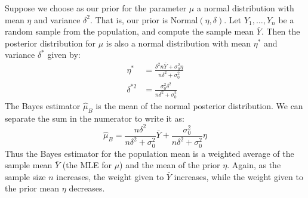 \documentclass[notes.tex]{subfiles}
\begin{document}
\begin{enumerate}
Suppose we choose as our prior for the parameter $\mu$ a normal distribution with mean $\eta$ and variance $\delta^2$. That is, our prior is Normal$(\eta, \delta)$. Let $Y_1, \dots, Y_n$ be a random sample from the population, and compute the sample mean $\bar{Y}$. Then the posterior distribution for $\mu$ is also a normal distribution with mean $\eta^*$ and variance $\delta^*$ given by:
\begin{align*}
\eta^* &= \frac{\delta^2 n \bar{Y} + \sigma_0^2 \eta}{n \delta^2 + \sigma_0^2} \\
\delta^{*2} &= \frac{\sigma_0^2 \delta^2 }{n \delta^2 + \sigma_0^2}
\end{align*}
The Bayes estimator $\hat{\mu}_B$ is the mean of the normal posterior distribution. We can separate the sum in the numerator to write it as:
\[
\hat{\mu}_B = \frac{ n \delta^2 }{n \delta^2 + \sigma_0^2}\bar{Y} + \frac{\sigma_0^2}{n \delta^2 + \sigma_0^2} \eta
\]
Thus the Bayes estimator for the population mean is a weighted average of the sample mean $\bar{Y}$ (the MLE for $\mu$) and the mean of the prior $\eta$. Again, as the sample size $n$ increases, the weight given to $\bar{Y}$ increases, while the weight given to the prior mean $\eta$ decreases.
\end{enumerate}
\end{document}
